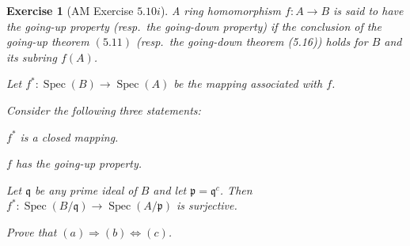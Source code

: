 \documentclass[12pt,letterpaper]{article}
\newtheorem{problem}{Exercise}[section]
\theoremstyle{definition}
\theoremstyle{remark}
\numberwithin{figure}{problem}
\numberwithin{equation}{section}
\DeclareMathOperator{\Spec}{Spec}
\begin{document}
\begin{problem}[AM Exercise $5.10i$]
  A ring homomorphism $f : A \to B$ is said to have the \emph{going-up property} \emph{(}resp.~the \emph{going-down property)} if the conclusion of the going-up theorem $(5.11)$ \emph{(}resp.~the \emph{going-down theorem (5.16))} holds for $B$ and its subring $f(A)$.
  \par Let $f^* : \Spec(B) \to \Spec(A)$ be the mapping associated with $f$.
  \par Consider the following three statements:
  \begin{enum}
    \item $f^*$ is a closed mapping.
    \item $f$ has the going-up property.
    \item Let $\mathfrak{q}$ be any prime ideal of $B$ and let $\mathfrak{p} = \mathfrak{q}^c$. Then $f^* : \Spec(B/\mathfrak{q}) \to \Spec(A/\mathfrak{p})$ is surjective.
  \end{enum}
  Prove that $(a) \Rightarrow (b) \Leftrightarrow (c)$.
\end{problem}
\end{document}
